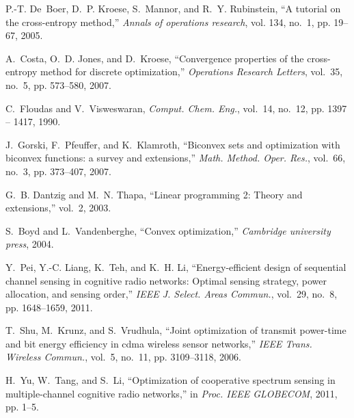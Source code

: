 \documentclass[journal]{IEEEtran} \ifCLASSINFOpdf
\begin{document}
\begin{thebibliography}{99}
P.-T. De~Boer, D.~P. Kroese, S.~Mannor, and R.~Y. Rubinstein, ``A tutorial on
  the cross-entropy method,'' \emph{Annals of operations research}, vol. 134,
  no.~1, pp. 19--67, 2005.

A.~Costa, O.~D. Jones, and D.~Kroese, ``Convergence properties of the
  cross-entropy method for discrete optimization,'' \emph{Operations Research
  Letters}, vol.~35, no.~5, pp. 573--580, 2007.

C.~Floudas and V.~Visweswaran, \emph{Comput. Chem. Eng.}, vol.~14, no.~12, pp.
  1397 -- 1417, 1990.

J.~Gorski, F.~Pfeuffer, and K.~Klamroth,
  ``Biconvex sets and optimization with biconvex
  functions: a survey and extensions,''
  \emph{Math. Method. Oper. Res.}, vol.~66,
  no.~3, pp. 373--407, 2007.

G.~B. Dantzig and M.~N. Thapa, ``Linear programming 2: Theory and extensions,''
  vol.~2, 2003.

S.~Boyd and L.~Vandenberghe, ``Convex optimization,'' \emph{Cambridge
  university press}, 2004.

Y.~Pei, Y.-C. Liang, K.~Teh, and K.~H. Li, ``Energy-efficient design of
  sequential channel sensing in cognitive radio networks: Optimal sensing
  strategy, power allocation, and sensing order,'' \emph{IEEE J. Select. Areas
  Commun.}, vol.~29, no.~8, pp. 1648--1659, 2011.

T.~Shu, M.~Krunz, and S.~Vrudhula, ``Joint optimization of transmit power-time
  and bit energy efficiency in cdma wireless sensor networks,'' \emph{IEEE
  Trans. Wireless Commun.}, vol.~5, no.~11, pp. 3109--3118, 2006.

H.~Yu, W.~Tang, and S.~Li, ``Optimization of cooperative spectrum sensing in
  multiple-channel cognitive radio networks,'' in \emph{Proc. IEEE GLOBECOM},
  2011, pp. 1--5.
\end{thebibliography}



\ifCLASSOPTIONcaptionsoff
  \newpage
\fi
\end{document}
